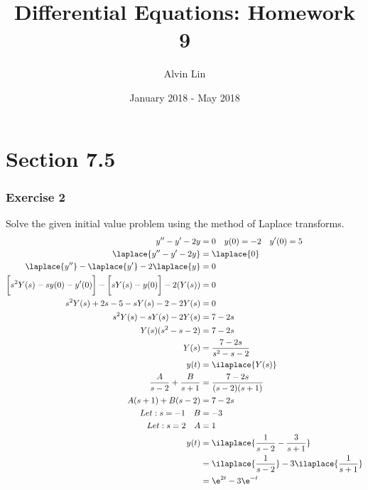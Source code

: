 \documentclass{math}
\title{Differential Equations: Homework 9}
\author{Alvin Lin}
\date{January 2018 - May 2018}
\begin{document}
\maketitle
\clearpage

\section*{Section 7.5}

\subsubsection*{Exercise 2}
Solve the given initial value problem using the method of Laplace transforms.
\begin{align*}
  y''-y'-2y &= 0 \quad y(0) = -2 \quad y'(0) = 5 \\
  \laplace{y''-y'-2y} &= \laplace{0} \\
  \laplace{y''}-\laplace{y'}-2\laplace{y} &= 0 \\
  \bigg[s^2Y(s)-sy(0)-y'(0)\bigg]-\bigg[sY(s)-y(0)\bigg]-2(Y(s)) &= 0 \\
  s^2Y(s)+2s-5-sY(s)-2-2Y(s) &= 0 \\
  s^2Y(s)-sY(s)-2Y(s) &= 7-2s \\
  Y(s)(s^2-s-2) &= 7-2s \\
  Y(s) &= \frac{7-2s}{s^2-s-2} \\
  y(t) &= \ilaplace{Y(s)} \\
  \frac{A}{s-2}+\frac{B}{s+1} &= \frac{7-2s}{(s-2)(s+1)} \\
  A(s+1)+B(s-2) &= 7-2s \\
  Let: s = -1 \quad B &= -3 \\
  Let: s = 2 \quad A &= 1 \\
  y(t) &= \ilaplace{\frac{1}{s-2}-\frac{3}{s+1}} \\
  &= \ilaplace{\frac{1}{s-2}}-3\ilaplace{\frac{1}{s+1}} \\
  &= \e^{2t}-3\e^{-t}
\end{align*}
\end{document}
